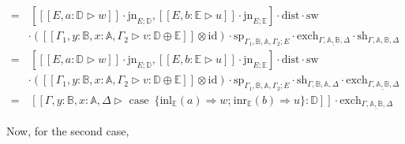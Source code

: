 \begin{equation*}
\begin{split}
 = &  \hspace{2pt}  \left[ [\![ E, a:\mathbb{D} \triangleright w ]\!] \cdot \text{jn}_{E;\mathbb{D}},[\![ E, b:\mathbb{E} \triangleright u]\!]\cdot \text{jn}_{E;\mathbb{E} }\right]  \cdot \text{dist} \cdot \text{sw} \\
 & \cdot ([\![\Gamma_{1}, y:\mathbb{B},x:\mathbb{A},\Gamma_{2} \triangleright v : \mathbb{D} \oplus \mathbb{E}  ]\!] \otimes \text{id})\cdot \text{sp}_{\Gamma_{1},\mathbb{B},\mathbb{A}, \Gamma_{2};E} \cdot \text{exch}_{\Gamma,  \underline{\mathbb{A},  \mathbb{B}}, \Delta}  \cdot \text{sh}_{\Gamma,\mathbb{A}, \mathbb{B},\Delta} \\
 = &\hspace{2pt}  \left[ [\![ E, a:\mathbb{D} \triangleright w ]\!] \cdot \text{jn}_{E;\mathbb{D}},[\![ E, b:\mathbb{E} \triangleright u]\!]\cdot \text{jn}_{E;\mathbb{E} }\right]  \cdot \text{dist} \cdot \text{sw} \\
 & \cdot ([\![\Gamma_{1}, y:\mathbb{B},x:\mathbb{A},\Gamma_{2}  \triangleright v : \mathbb{D} \oplus \mathbb{E}  ]\!] \otimes \text{id}) \cdot \text{sp}_{\Gamma_{1},\mathbb{B},\mathbb{A}, \Gamma_{2};E}  \cdot \text{sh}_{\Gamma,\mathbb{B}, \mathbb{A},\Delta}  \cdot \text{exch}_{\Gamma,  \underline{\mathbb{A},\mathbb{B}}, \Delta} \\
 = & \hspace{2pt} [\![\Gamma,y:\mathbb{B}, x:\mathbb{A}, \Delta \triangleright \text{ case }  \hspace{2pt}  \{\text{inl}_{\mathbb{E}} (a) \Rightarrow w ; \hspace{1pt} \text{inr}_{\mathbb{E}} (b) \Rightarrow u\}: \mathbb{D}]\!] \cdot \text{exch}_{\Gamma,  \underline{\mathbb{A}, \mathbb{B}}, \Delta} 
\end{split}
\end{equation*}


\vspace{10pt}

Now, for the second case, 

